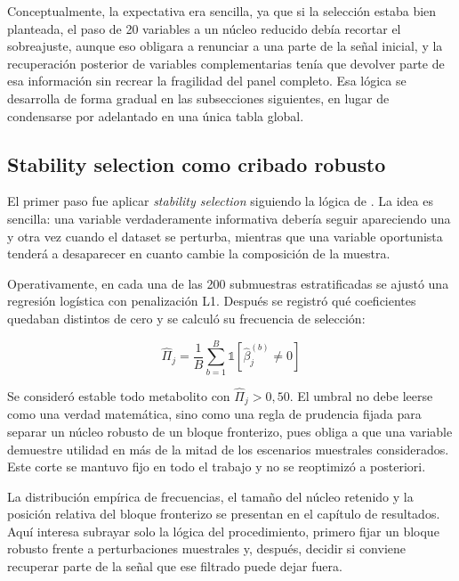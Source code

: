 Conceptualmente, la expectativa era sencilla, ya que si la selección estaba bien planteada, el paso de 20 variables a un núcleo
reducido debía recortar el sobreajuste, aunque eso obligara a renunciar a una parte de la señal inicial, y la
recuperación posterior de variables complementarias tenía que devolver parte de esa información sin recrear la fragilidad
del panel completo. Esa lógica se desarrolla de forma gradual en las subsecciones siguientes, en lugar de condensarse por
adelantado en una única tabla global.

\subsection{Stability selection como cribado robusto}\label{sec:stability}

El primer paso fue aplicar \textit{stability selection} siguiendo la lógica de \textcite{meinshausen2010stability}. La
idea es sencilla: una variable verdaderamente informativa debería seguir apareciendo una y otra vez cuando el dataset se
perturba, mientras que una variable oportunista tenderá a desaparecer en cuanto cambie la composición de la muestra.

Operativamente, en cada una de las 200 submuestras estratificadas se ajustó una regresión logística con penalización
L1. Después se registró qué coeficientes quedaban distintos de cero y se calculó su frecuencia de selección:

\begin{equation}
\hat{\Pi}_j = \frac{1}{B} \sum_{b=1}^{B} \mathbb{1}\left[\hat{\beta}_j^{(b)} \neq 0\right]
\end{equation}

Se consideró estable todo metabolito con $\hat{\Pi}_j > 0{,}50$. El umbral no debe leerse como una verdad matemática,
sino como una regla de prudencia fijada para separar un núcleo robusto de un bloque fronterizo, pues obliga a que una
variable demuestre utilidad en más de la mitad de los escenarios muestrales considerados. Este corte se mantuvo fijo en
todo el trabajo y no se reoptimizó a posteriori.

La distribución empírica de frecuencias, el tamaño del núcleo retenido y la posición relativa del bloque fronterizo se
presentan en el capítulo de resultados. Aquí interesa subrayar solo la lógica del procedimiento, primero fijar un bloque
robusto frente a perturbaciones muestrales y, después, decidir si conviene recuperar parte de la señal que ese filtrado
puede dejar fuera.

